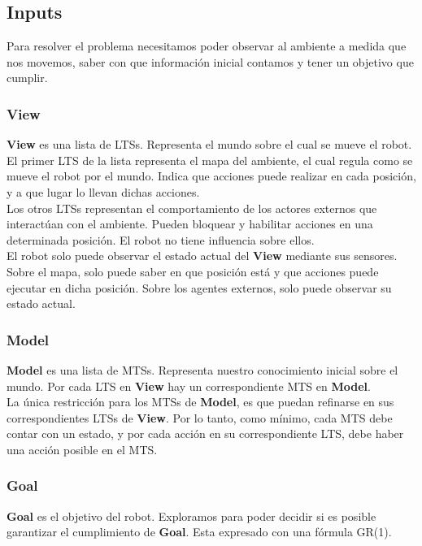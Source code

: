 \subsection{Inputs}

Para resolver el problema necesitamos poder observar al ambiente a medida que nos movemos, saber con que información inicial 
contamos y tener un objetivo que cumplir.

\subsubsection{View}
\textbf{View} es una lista de LTSs. Representa el mundo sobre el cual se mueve el robot.\\
El primer LTS de la lista representa el mapa del ambiente, el cual regula como se mueve el robot por el mundo. Indica que acciones
puede realizar en cada posición, y a que lugar lo llevan dichas acciones.\\
Los otros LTSs representan el comportamiento de los actores externos que interactúan con el ambiente. Pueden bloquear y habilitar
acciones en una determinada posición. El robot no tiene influencia sobre ellos.\\
El robot solo puede observar el estado actual del \textbf{View} mediante sus sensores. Sobre el mapa, solo puede saber en que posición está
y que acciones puede ejecutar en dicha posición. Sobre los agentes externos, solo puede observar su estado actual.

\subsubsection{Model}
\textbf{Model} es una lista de MTSs. Representa nuestro conocimiento inicial sobre el mundo. Por cada LTS en \textbf{View} hay un correspondiente MTS
en \textbf{Model}.\\
La única restricción para los MTSs de \textbf{Model}, es que puedan refinarse en sus correspondientes LTSs de \textbf{View}. Por lo tanto, como mínimo,
cada MTS debe contar con un estado, y por cada acción en su correspondiente LTS, debe haber una acción posible en el MTS.

\subsubsection{Goal}
\textbf{Goal} es el objetivo del robot. Exploramos para poder decidir si es posible garantizar el cumplimiento de \textbf{Goal}. Esta expresado con una 
fórmula GR\big(1\big).

